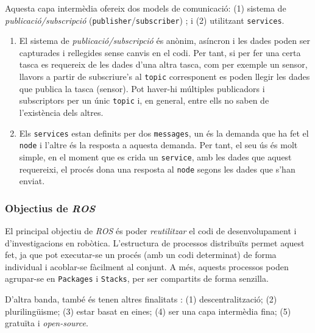 \documentclass[12pt,a4paper,final,twoside]{report}
\begin{document}
Aquesta capa intermèdia ofereix dos models de comunicació: (1) sistema de \textit{publicació/subscripció} (\texttt{publisher}/\texttt{subscriber}) ; i (2) utilitzant \texttt{services}.

\begin{enumerate}

\item El sistema de \textit{publicació/subscripció} és anònim, asíncron i les dades poden ser capturades i rellegides sense canvis en el codi. Per tant, si per fer una certa tasca es requereix de les dades d'una altra tasca, com per exemple un sensor, llavors a partir de subscriure's al \texttt{topic} corresponent es poden llegir les dades que publica la tasca (sensor). Pot haver-hi múltiples publicadors i subscriptors per un únic \texttt{topic} i, en general, entre ells no saben de l'existència dels altres.

\item Els \texttt{services} estan definits per dos \texttt{messages}, un és la demanda que ha fet el \texttt{node} i l'altre és la resposta a aquesta demanda. Per tant, el seu ús és molt simple, en el moment que es crida un \texttt{service}, amb les dades que aquest requereixi, el procés dona una resposta al \texttt{node} segons les dades que s'han enviat.
\end{enumerate}


\subsubsection{Objectius de \textit{ROS}}

El principal objectiu de \textit{ROS} és poder \textit{reutilitzar} el codi de desenvolupament i d'investigacions en robòtica. L'estructura de processos distribuïts permet aquest fet, ja que pot executar-se un procés (amb un codi determinat) de forma individual i acoblar-se fàcilment al conjunt. A més, aquests processos poden agrupar-se en \texttt{Packages} i \texttt{Stacks}, per ser compartits de forma senzilla.

D'altra banda, també és tenen altres finalitats \cite{Quigley}: (1) descentralització; (2) plurilingüisme; (3) estar basat en eines; (4) ser una capa intermèdia fina; (5) gratuïta i \textit{open-source}.
\end{document}
